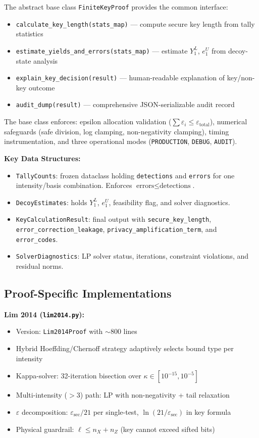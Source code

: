 \documentclass[11pt,a4paper,oneside]{report}
\begin{document}
The abstract base class \texttt{FiniteKeyProof} provides the common interface:

\begin{itemize}
\item \texttt{calculate\_key\_length(stats\_map)} — compute secure key length from tally statistics
\item \texttt{estimate\_yields\_and\_errors(stats\_map)} — estimate $Y_1^L$, $e_1^U$ from decoy-state analysis
\item \texttt{explain\_key\_decision(result)} — human-readable explanation of key/non-key outcome
\item \texttt{audit\_dump(result)} — comprehensive JSON-serializable audit record
\end{itemize}

The base class enforces: epsilon allocation validation ($\sum \varepsilon_i \leq \varepsilon_{\text{total}}$), numerical safeguards (safe division, log clamping, non-negativity clamping), timing instrumentation, and three operational modes (\texttt{PRODUCTION}, \texttt{DEBUG}, \texttt{AUDIT}).

\textbf{Key Data Structures:}
\begin{itemize}
\item \texttt{TallyCounts}: frozen dataclass holding \texttt{detections} and \texttt{errors} for one intensity/basis combination. Enforces $\text{errors} \leq \text{detections}$.
\item \texttt{DecoyEstimates}: holds $Y_1^L$, $e_1^U$, feasibility flag, and solver diagnostics.
\item \texttt{KeyCalculationResult}: final output with \texttt{secure\_key\_length}, \texttt{error\_correction\_leakage}, \texttt{privacy\_amplification\_term}, and \texttt{error\_codes}.
\item \texttt{SolverDiagnostics}: LP solver status, iterations, constraint violations, and residual norms.
\end{itemize}

\subsection{Proof-Specific Implementations}

\textbf{Lim 2014 (\texttt{lim2014.py}):}
\begin{itemize}
\item Version: \texttt{Lim2014Proof} with $\sim$800 lines
\item Hybrid Hoeffding/Chernoff strategy adaptively selects bound type per intensity
\item Kappa-solver: 32-iteration bisection over $\kappa \in [10^{-15}, 10^{-5}]$
\item Multi-intensity ($>3$) path: LP with non-negativity + tail relaxation
\item $\varepsilon$ decomposition: $\varepsilon_{\text{sec}}/21$ per single-test, $\ln(21/\varepsilon_{\text{sec}})$ in key formula
\item Physical guardrail: $\ell \leq n_X + n_Z$ (key cannot exceed sifted bits)
\end{itemize}
\end{document}
